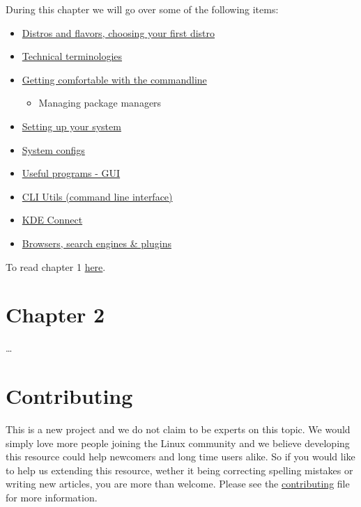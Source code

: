 \documentclass[a4]{article}
\begin{document}
During this chapter we will go over some of the following items:

\begin{itemize}
\item \href{./Chapter\_1/distros.md}{Distros and flavors, choosing your first distro}
\item \href{./Chapter\_1/technical\_terminologies.md}{Technical terminologies}
\item \href{./Chapter\_1/getting\_comfortable.md}{Getting comfortable with the commandline}
\begin{itemize}
\item Managing package managers
\end{itemize}
\item \href{./Chapter\_1/setting\_up.md}{Setting up your system}
\item \href{./Chapter\_1/system\_configs.md}{System configs}
\item \href{./Chapter\_1/GUI\_programs.md}{Useful programs - GUI}
\item \href{./Chapter\_1/CLI\_programs.md}{CLI Utils (command line interface)}
\item \href{./Chapter\_1/KDE\_connect.md}{KDE Connect}
\item \href{./Chapter\_1/browsers.md}{Browsers, search engines \& plugins}
\end{itemize}

To read chapter 1 \href{./Chapter\_1/README.md}{here}.

\section*{Chapter 2}
\label{sec:org61b8627}

\ldots{}

\section*{Contributing}
\label{sec:orgad88ff0}

This is a new project and we do not claim to be experts on this topic. We would simply love more people joining the Linux community and we believe developing this resource could help newcomers and long time users alike. So if you would like to help us extending this resource, wether it being correcting spelling mistakes or writing new articles, you are more than welcome. Please see the \href{./CONTRIBUTING.org}{contributing} file for more information.
\end{document}
